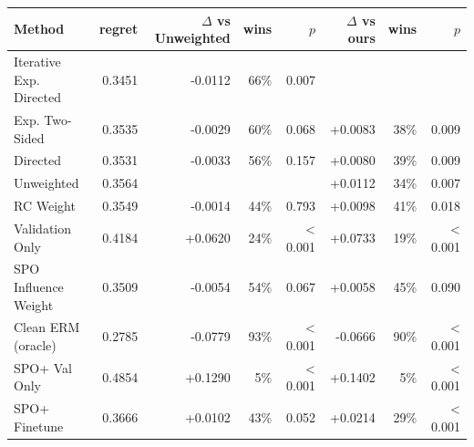 \begin{tabular}{lrrrrrrr}
\toprule
Method & regret & $\Delta$ vs Unweighted & wins & $p$ & $\Delta$ vs ours & wins & $p$ \\
\midrule
Iterative Exp. Directed & 0.3451 & -0.0112 & 66\% & 0.007 &  &  &  \\
Exp. Two-Sided & 0.3535 & -0.0029 & 60\% & 0.068 & +0.0083 & 38\% & 0.009 \\
Directed & 0.3531 & -0.0033 & 56\% & 0.157 & +0.0080 & 39\% & 0.009 \\
Unweighted & 0.3564 &  &  &  & +0.0112 & 34\% & 0.007 \\
RC Weight & 0.3549 & -0.0014 & 44\% & 0.793 & +0.0098 & 41\% & 0.018 \\
Validation Only & 0.4184 & +0.0620 & 24\% & < 0.001 & +0.0733 & 19\% & < 0.001 \\
SPO Influence Weight & 0.3509 & -0.0054 & 54\% & 0.067 & +0.0058 & 45\% & 0.090 \\
Clean ERM (oracle) & 0.2785 & -0.0779 & 93\% & < 0.001 & -0.0666 & 90\% & < 0.001 \\
SPO+ Val Only & 0.4854 & +0.1290 & 5\% & < 0.001 & +0.1402 & 5\% & < 0.001 \\
SPO+ Finetune & 0.3666 & +0.0102 & 43\% & 0.052 & +0.0214 & 29\% & < 0.001 \\
\bottomrule
\end{tabular}
